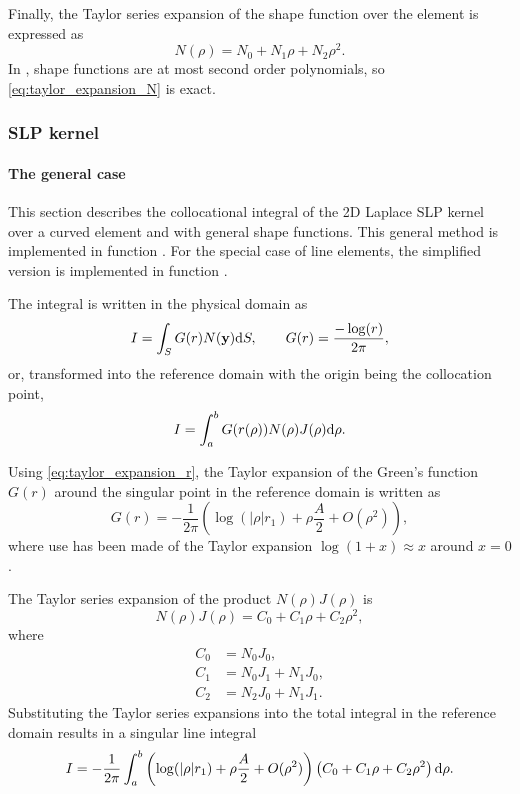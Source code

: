 Finally, the Taylor series expansion of the shape function over the element is expressed as
%
\begin{equation}
	N(\rho) = N_0 + N_1 \rho + N_2 \rho^2
	.
	\label{eq:taylor_expansion_N}
\end{equation}
%
In \NiHu{}, shape functions are at most second order polynomials, so \eqref{eq:taylor_expansion_N} is exact.


\subsubsection{SLP kernel}

\paragraph{The general case}

This section describes the collocational integral of the 2D Laplace SLP kernel over a curved element and with general shape functions.
This general method is implemented in function .
For the special case of line elements, the simplified version is implemented in function .

The integral is written in the physical domain as
%
\begin{equation}
	I = \int_S G(r) N({\bf y}) \mathrm{d} S, \qquad G(r) = \frac{-\log(r)}{2\pi}
	,
\end{equation}
%
or, transformed into the reference domain with the origin being the collocation point,
%
\begin{equation}
	I = \int_a^b G(r(\rho)) N(\rho) J(\rho) \mathrm{d} \rho
	.
\end{equation}

Using \eqref{eq:taylor_expansion_r}, the Taylor expansion of the Green's function $G(r)$ around the singular point in the reference domain is written as
%
\begin{equation}
	G(r) = -\frac{1}{2\pi} \left(
		\log (|\rho| r_1) + \rho \frac{A}{2} + O(\rho^2)
		\right)
	,
\end{equation}
%
where use has been made of the Taylor expansion $\log(1+x) \approx x$ around $x=0$.

The Taylor series expansion of the product $N(\rho) J(\rho)$ is
%
\begin{equation}
	N(\rho) J(\rho) = C_0 + C_1 \rho + C_2 \rho^2
	,
\end{equation}
%
where
%
\begin{align}
	C_0 &= N_0 J_0, \\
	C_1 &= N_0 J_1 + N_1 J_0, \\
	C_2 &= N_2 J_0 + N_1 J_1.
\end{align}
%
Substituting the Taylor series expansions into the total integral in the reference domain results in a singular line integral
%
\begin{equation}
	I = -\frac{1}{2\pi} \int_{a}^{b}
	 \left(
		\log (|\rho| r_1) + \rho \frac{A}{2} + O(\rho^2)
	\right)
	\left( C_0 + C_1 \rho + C_2 \rho^2 \right) \mathrm{d}\rho
	.
\end{equation}

